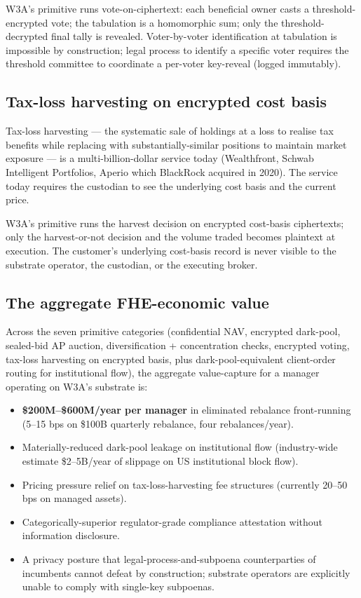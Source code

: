 W3A's primitive runs vote-on-ciphertext: each beneficial owner casts a
threshold-encrypted vote; the tabulation is a homomorphic sum; only
the threshold-decrypted final tally is revealed. Voter-by-voter
identification at tabulation is impossible by construction; legal
process to identify a specific voter requires the threshold committee
to coordinate a per-voter key-reveal (logged immutably).

\subsection{Tax-loss harvesting on encrypted cost basis}

Tax-loss harvesting --- the systematic sale of holdings at a loss to
realise tax benefits while replacing with substantially-similar
positions to maintain market exposure --- is a multi-billion-dollar
service today (Wealthfront, Schwab Intelligent Portfolios, Aperio
which BlackRock acquired in 2020). The service today requires the
custodian to see the underlying cost basis and the current price.

W3A's primitive runs the harvest decision on encrypted cost-basis
ciphertexts; only the harvest-or-not decision and the volume traded
becomes plaintext at execution. The customer's underlying cost-basis
record is never visible to the substrate operator, the custodian, or
the executing broker.

\subsection{The aggregate FHE-economic value}

Across the seven primitive categories (confidential NAV, encrypted
dark-pool, sealed-bid AP auction, diversification + concentration
checks, encrypted voting, tax-loss harvesting on encrypted basis,
plus dark-pool-equivalent client-order routing for institutional flow),
the aggregate value-capture for a manager operating on W3A's substrate
is:

\begin{itemize}[leftmargin=2em,itemsep=0.1em]
\item \textbf{\$200M--\$600M/year per manager} in eliminated rebalance
front-running (5--15 bps on \$100B quarterly rebalance, four
rebalances/year).
\item Materially-reduced dark-pool leakage on institutional flow
(industry-wide estimate \$2--5B/year of slippage on US institutional
block flow).
\item Pricing pressure relief on tax-loss-harvesting fee structures
(currently 20--50 bps on managed assets).
\item Categorically-superior regulator-grade compliance attestation
without information disclosure.
\item A privacy posture that legal-process-and-subpoena counterparties
of incumbents cannot defeat by construction; substrate operators are
explicitly unable to comply with single-key subpoenas.
\end{itemize}

